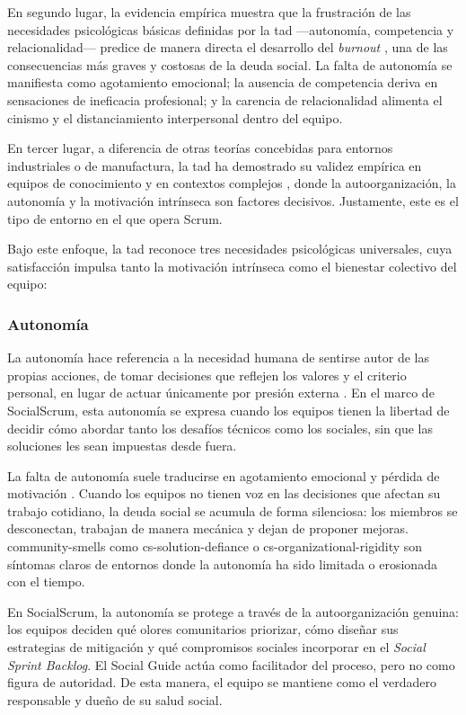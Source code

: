 En segundo lugar, la evidencia empírica muestra que la frustración de las necesidades psicológicas básicas definidas por la \acrfull{tad} —autonomía, competencia y relacionalidad— predice de manera directa el desarrollo del \textit{burnout} \cite{tulili2022burnout}, una de las consecuencias más graves y costosas de la deuda social.
La falta de autonomía se manifiesta como agotamiento emocional; la ausencia de competencia deriva en sensaciones de ineficacia profesional; y la carencia de relacionalidad alimenta el cinismo y el distanciamiento interpersonal dentro del equipo.

En tercer lugar, a diferencia de otras teorías concebidas para entornos industriales o de manufactura, la \acrfull{tad} ha demostrado su validez empírica en equipos de conocimiento y en contextos complejos \cite{ryan_self-determination_2000}, donde la autoorganización, la autonomía y la motivación intrínseca son factores decisivos. Justamente, este es el tipo de entorno en el que opera Scrum.

Bajo este enfoque, la \acrfull{tad} reconoce tres necesidades psicológicas universales, cuya satisfacción impulsa tanto la motivación intrínseca como el bienestar colectivo del equipo:

\subsubsection{Autonomía}

La autonomía hace referencia a la necesidad humana de sentirse autor de las propias acciones, de tomar decisiones que reflejen los valores y el criterio personal, en lugar de actuar únicamente por presión externa \cite{ryan_self-determination_2000}.
En el marco de SocialScrum, esta autonomía se expresa cuando los equipos tienen la libertad de decidir cómo abordar tanto los desafíos técnicos como los sociales, sin que las soluciones les sean impuestas desde fuera.

La falta de autonomía suele traducirse en agotamiento emocional y pérdida de motivación \cite{tulili2022burnout}.
Cuando los equipos no tienen voz en las decisiones que afectan su trabajo cotidiano, la deuda social se acumula de forma silenciosa: los miembros se desconectan, trabajan de manera mecánica y dejan de proponer mejoras.
\gls{community-smells} como \gls{cs-solution-defiance} o \gls{cs-organizational-rigidity} son síntomas claros de entornos donde la autonomía ha sido limitada o erosionada con el tiempo.

En SocialScrum, la autonomía se protege a través de la autoorganización genuina: los equipos deciden qué olores comunitarios priorizar, cómo diseñar sus estrategias de mitigación y qué compromisos sociales incorporar en el \textit{Social Sprint Backlog}.
El Social Guide actúa como facilitador del proceso, pero no como figura de autoridad. De esta manera, el equipo se mantiene como el verdadero responsable y dueño de su salud social.

